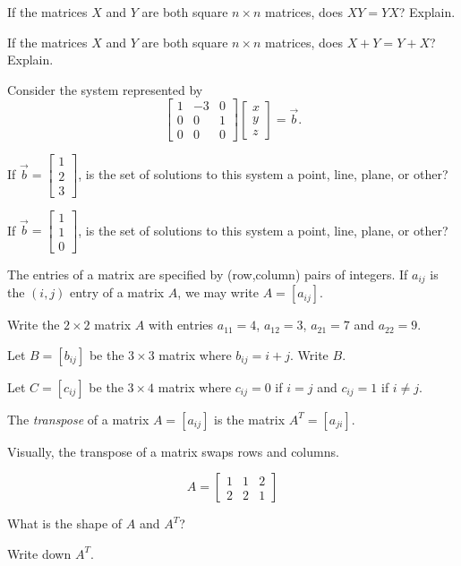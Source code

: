 \documentclass{problemset}
\newcommand{\mat}[1]{\begin{bmatrix}#1\end{bmatrix}}
\begin{document}
	\question
	\begin{parts}
		\item If the matrices $X$ and $Y$ are both square $n\times n$ matrices,
		does $XY=YX$?  Explain.
		\item If the matrices $X$ and $Y$ are both square $n\times n$ matrices,
		does $X+Y=Y+X$?  Explain.
	\end{parts}

	\question
	Consider the system represented by
	\[
		\mat{1&-3&0\\0&0&1\\0&0&0}\mat{x\\y\\z}=\vec b.
	\]
	\begin{parts}
		\item If $\vec b=\mat{1\\2\\3}$, is the set of solutions to this system a 
		point, line, plane, or other?
		\item If $\vec b=\mat{1\\1\\0}$, is the set of solutions to this system a 
		point, line, plane, or other?
	\end{parts}

	\question
	The entries of a matrix are specified by (row,column) pairs of integers.  If
	$a_{ij}$ is the $(i,j)$ entry of a matrix $A$, we may write $A=[a_{ij}]$.
	\begin{parts}
		\item Write the $2\times 2$ matrix $A$ with entries $a_{11} = 4$, $a_{12}=3$,
			$a_{21} = 7$ and $a_{22}=9$.
		\item Let $B=[b_{ij}]$ be the $3\times 3$ matrix where $b_{ij} = i+j$.  Write $B$.
		\item Let $C=[c_{ij}]$ be the $3\times 4$ matrix where $c_{ij} = 0$ if $i=j$ and
			$c_{ij}=1$ if $i\neq j$.
	\end{parts}

	\question
	\begin{definition}
		The \emph{transpose} of a matrix $A=[a_{ij}]$ is the matrix $A^{T}=[a_{ji}]$.
	\end{definition}
	Visually, the transpose of a matrix swaps rows and columns.

	\[
		A=\mat{1&1&2\\2&2&1}
	\]
	\begin{parts}
		\item What is the shape of $A$ and $A^T$?
		\item Write down $A^T$.
	\end{parts}
\end{document}
